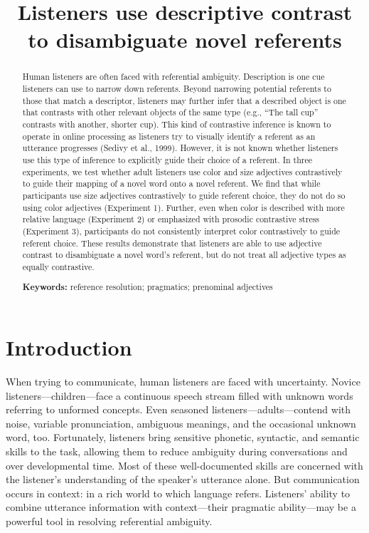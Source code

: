 \documentclass[10pt, letterpaper]{article}
\title{Listeners use descriptive contrast to disambiguate novel referents}
\begin{document}
\maketitle

\begin{abstract}
Human listeners are often faced with referential ambiguity. Description
is one cue listeners can use to narrow down referents. Beyond narrowing
potential referents to those that match a descriptor, listeners may
further infer that a described object is one that contrasts with other
relevant objects of the same type (e.g., ``The tall cup'' contrasts with
another, shorter cup). This kind of contrastive inference is known to
operate in online processing as listeners try to visually identify a
referent as an utterance progresses (Sedivy et al., 1999). However, it
is not known whether listeners use this type of inference to explicitly
guide their choice of a referent. In three experiments, we test whether
adult listeners use color and size adjectives contrastively to guide
their mapping of a novel word onto a novel referent. We find that while
participants use size adjectives contrastively to guide referent choice,
they do not do so using color adjectives (Experiment 1). Further, even
when color is described with more relative language (Experiment 2) or
emphasized with prosodic contrastive stress (Experiment 3), participants
do not consistently interpret color contrastively to guide referent
choice. These results demonstrate that listeners are able to use
adjective contrast to disambiguate a novel word's referent, but do not
treat all adjective types as equally contrastive.

\textbf{Keywords:}
reference resolution; pragmatics; prenominal adjectives
\end{abstract}

\section{Introduction}\label{introduction}

When trying to communicate, human listeners are faced with uncertainty.
Novice listeners---children---face a continuous speech stream filled
with unknown words referring to unformed concepts. Even seasoned
listeners---adults---contend with noise, variable pronunciation,
ambiguous meanings, and the occasional unknown word, too. Fortunately,
listeners bring sensitive phonetic, syntactic, and semantic skills to
the task, allowing them to reduce ambiguity during conversations and
over developmental time. Most of these well-documented skills are
concerned with the listener's understanding of the speaker's utterance
alone. But communication occurs in context: in a rich world to which
language refers. Listeners' ability to combine utterance information
with context---their pragmatic ability---may be a powerful tool in
resolving referential ambiguity.
\end{document}
